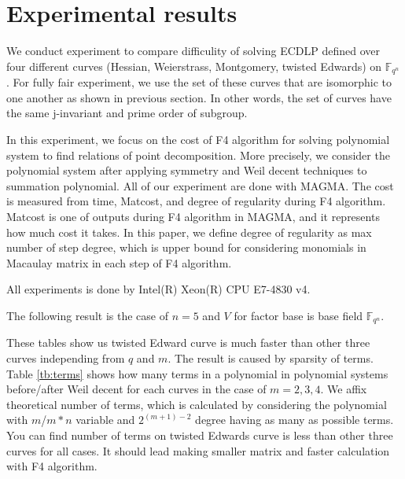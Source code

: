 \section{Experimental results}
\label{sec:experiment}

We conduct experiment to compare difficulity of solving ECDLP 
defined over four different curves 
(Hessian, Weierstrass, Montgomery, twisted Edwards) on $\mathbb{F}_{q^n}$.
For fully fair experiment, we use the set of these curves 
that are isomorphic to one another as shown in previous section.
In other words, the set of curves have the same j-invariant 
and prime order of subgroup.

In this experiment, we focus on the cost of F4 algorithm for solving polynomial 
system to find relations of point decomposition.
More precisely, we consider the polynomial system 
after applying symmetry and Weil decent techniques to summation polynomial.
All of our experiment are done with MAGMA. 
The cost is measured from time, Matcost, and degree of regularity 
during F4 algorithm.
Matcost is one of outputs during F4 algorithm in MAGMA, 
and it represents how much cost it takes.
In this paper, we define degree of regularity as max number of step degree, 
which is upper bound for considering monomials in Macaulay matrix 
in each step of F4 algorithm.

All experiments is done by Intel(R) Xeon(R) CPU E7-4830 v4.


The following result is the case of $n=5$ and 
$V$ for factor base is base field $\mathbb{F}_{q^n}$.



These tables show us twisted Edward curve is much faster than 
other three curves independing from $q$ and $m$.
The result is caused by sparsity of terms.
Table \ref{tb:terms} shows how many terms in a polynomial in polynomial systems 
before/after Weil decent for each curves in the case of $m=2,3,4$.
We affix theoretical number of terms, which is calculated by considering
the polynomial with $m$/$m*n$ variable and $2^{(m+1)-2}$ degree 
having as many as possible terms. 
You can find number of terms on twisted Edwards curve is less than 
other three curves for all cases.
It should lead making smaller matrix and faster calculation with F4 algorithm.



